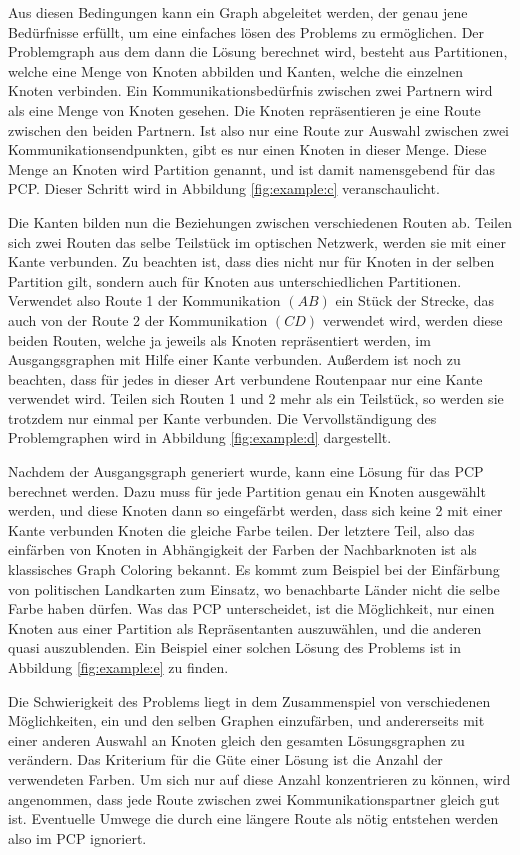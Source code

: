 Aus diesen Bedingungen kann ein Graph abgeleitet werden, der genau jene Bedürfnisse erfüllt, um eine einfaches lösen des Problems zu ermöglichen. Der Problemgraph
aus dem dann die Lösung berechnet wird, besteht aus Partitionen, welche eine Menge von Knoten abbilden und Kanten, welche die einzelnen Knoten verbinden.
Ein Kommunikationsbedürfnis zwischen zwei Partnern wird als eine Menge von Knoten gesehen. Die Knoten repräsentieren je eine Route zwischen den beiden Partnern. Ist also nur eine Route zur Auswahl
zwischen zwei Kommunikationsendpunkten, gibt es nur einen Knoten in dieser Menge. Diese Menge an Knoten wird Partition genannt, und ist damit namensgebend für das PCP. Dieser
Schritt wird in Abbildung \ref{fig:example:c} veranschaulicht.

Die Kanten bilden nun die Beziehungen zwischen verschiedenen Routen ab. Teilen sich zwei Routen das selbe Teilstück im optischen Netzwerk, werden sie mit einer Kante verbunden.
Zu beachten ist, dass dies nicht nur für Knoten in der selben Partition gilt, sondern auch für Knoten aus unterschiedlichen Partitionen. Verwendet also Route 1 der
Kommunikation $(AB)$ ein Stück der Strecke, das auch von der Route 2 der Kommunikation $(CD)$ verwendet wird, werden diese beiden Routen, welche ja jeweils als Knoten
repräsentiert werden, im Ausgangsgraphen mit Hilfe einer Kante verbunden. Außerdem ist noch zu beachten, dass für jedes in dieser Art verbundene Routenpaar nur eine Kante
verwendet wird. Teilen sich Routen 1 und 2 mehr als ein Teilstück, so werden sie trotzdem nur einmal per Kante verbunden. Die Vervollständigung des Problemgraphen
wird in Abbildung \ref{fig:example:d} dargestellt.

Nachdem der Ausgangsgraph generiert wurde, kann eine Lösung für das PCP berechnet werden. Dazu muss für jede Partition genau ein Knoten ausgewählt werden, und diese
Knoten dann so eingefärbt werden, dass sich keine 2 mit einer Kante verbunden Knoten die gleiche Farbe teilen. Der letztere Teil, also das einfärben von Knoten in
Abhängigkeit der Farben der Nachbarknoten ist als klassisches Graph Coloring bekannt. Es kommt zum Beispiel bei der Einfärbung von politischen Landkarten zum Einsatz, 
wo benachbarte Länder nicht die selbe Farbe haben dürfen. Was das PCP unterscheidet, ist die Möglichkeit, nur einen Knoten aus einer Partition als Repräsentanten
auszuwählen, und die anderen quasi auszublenden. Ein Beispiel einer solchen Lösung des Problems ist in Abbildung \ref{fig:example:e} zu finden.

Die Schwierigkeit des Problems liegt in dem Zusammenspiel von verschiedenen Möglichkeiten, ein und den selben Graphen einzufärben, und andererseits mit einer anderen 
Auswahl an Knoten gleich den gesamten Lösungsgraphen zu verändern. Das Kriterium für die Güte einer Lösung ist die Anzahl der verwendeten Farben. Um sich nur auf diese 
Anzahl konzentrieren zu können, wird angenommen, dass jede Route zwischen zwei Kommunikationspartner gleich gut ist. Eventuelle Umwege die durch eine längere Route als nötig 
entstehen werden also im PCP ignoriert. 


